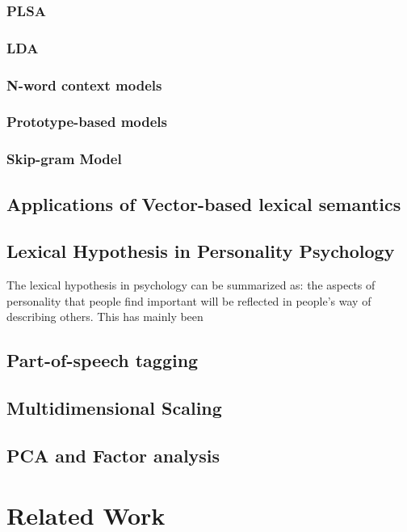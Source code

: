 \documentclass[10pt,letterpaper]{book}
\begin{document}
\subsection{PLSA}

\subsection{LDA}

\subsection{N-word context models}

\subsection{Prototype-based models}

\subsection{Skip-gram Model}

\section{Applications of Vector-based lexical semantics}


\section{Lexical Hypothesis in Personality Psychology}


The lexical hypothesis in psychology can be summarized as: the aspects of personality that people find important will be reflected in people's way of describing others. This has mainly been

\section{Part-of-speech tagging}

\section{Multidimensional Scaling}

\section{PCA and Factor analysis}

\chapter{Related Work}
\end{document}
